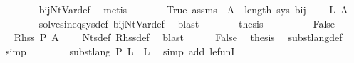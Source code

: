 \begin{isabellebody}
\ \ \ \ \ \ \isamarkupfalse%
\ bij{\isacharunderscore}{\kern0pt}Nt{\isacharunderscore}{\kern0pt}Var{\isacharunderscore}{\kern0pt}def\ \isamarkupfalse%
\ metis\isanewline
\ \ \ \ \isamarkupfalse%
\ \isamarkupfalse%
\ True\ assms{\isacharparenleft}{\kern0pt}{}{\isacharparenright}{\kern0pt}\ {\isacartoucheopen}{\isasymgamma}{\isacharprime}{\kern0pt}\ A\ {\isacharless}{\kern0pt}\ length\ sys{\isacartoucheclose}\ bij{\isacharunderscore}{\kern0pt}{\isasymgamma}{\isacharunderscore}{\kern0pt}{\isasymgamma}{\isacharprime}{\kern0pt}\ \isamarkupfalse%
\ {\isachardoublequoteopen}{\isasymdots}\ {\isasymsubseteq}\ {\isacharquery}{\kern0pt}L{\isacharprime}{\kern0pt}\ A{\isachardoublequoteclose}\isanewline
\ \ \ \ \ \ \isamarkupfalse%
\ solves{\isacharunderscore}{\kern0pt}ineq{\isacharunderscore}{\kern0pt}sys{\isacharunderscore}{\kern0pt}def\ bij{\isacharunderscore}{\kern0pt}Nt{\isacharunderscore}{\kern0pt}Var{\isacharunderscore}{\kern0pt}def\ \isamarkupfalse%
\ blast\isanewline
\ \ \ \ \isamarkupfalse%
\ \isamarkupfalse%
\ {\isacharquery}{\kern0pt}thesis\ \isakeywordONE{{\isachardot}{\kern0pt}}\isamarkupfalse%
\isanewline
\ \ \isamarkupfalse%
\isanewline
\ \ \ \ \isamarkupfalse%
\ False\isanewline
\ \ \ \ \isamarkupfalse%
\ \isamarkupfalse%
\ {\isachardoublequoteopen}Rhss\ P\ A\ {\isacharequal}{\kern0pt}\ {\isacharbraceleft}{\kern0pt}{\isacharbraceright}{\kern0pt}{\isachardoublequoteclose}\ \isamarkupfalse%
\ Nts{\isacharunderscore}{\kern0pt}def\ Rhss{\isacharunderscore}{\kern0pt}def\ \isamarkupfalse%
\ blast\isanewline
\ \ \ \ \isamarkupfalse%
\ False\ \isamarkupfalse%
\ {\isacharquery}{\kern0pt}thesis\ \isamarkupfalse%
\ subst{\isacharunderscore}{\kern0pt}lang{\isacharunderscore}{\kern0pt}def\ \isamarkupfalse%
\ simp\isanewline
\ \ \isamarkupfalse%
\isanewline
\ \ \isamarkupfalse%
\ \isamarkupfalse%
\ {\isachardoublequoteopen}subst{\isacharunderscore}{\kern0pt}lang\ P\ {\isacharquery}{\kern0pt}L{\isacharprime}{\kern0pt}\ {\isasymle}\ {\isacharquery}{\kern0pt}L{\isacharprime}{\kern0pt}{\isachardoublequoteclose}\ \isamarkupfalse%
\ {\isacharparenleft}{\kern0pt}simp\ add{\isacharcolon}{\kern0pt}\ le{\isacharunderscore}{\kern0pt}funI{\isacharparenright}{\kern0pt}\isanewline

\end{isabellebody}
